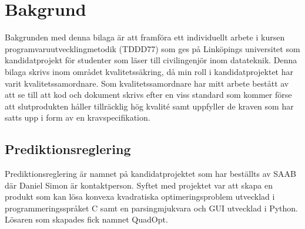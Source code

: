 \section{Bakgrund}
Bakgrunden med denna bilaga är att framföra ett individuellt arbete i kursen programvaruutvecklingmetodik (TDDD77) som ges på Linköpings universitet som kandidatprojekt för studenter som läser till civilingenjör inom datateknik. 
\newline
\newline
Denna bilaga skrivs inom området kvalitetssäkring, då min roll i kandidatprojektet har varit kvalitetssamordnare. Som kvalitetssamordnare har mitt arbete bestått av att se till att kod och dokument skrivs efter en viss standard som kommer förse att slutprodukten håller tillräcklig hög kvalité samt uppfyller de kraven som har satts upp i form av en kravspecifikation.

\subsection{Prediktionsreglering}
Prediktionsreglering är namnet på kandidatprojektet som har beställts av SAAB där Daniel Simon är kontaktperson. Syftet med projektet var att skapa en produkt som kan lösa konvexa kvadratiska optimeringsproblem utvecklad i programmeringsspråket C samt en parsingmjukvara och GUI utvecklad i Python. Lösaren som skapades fick namnet QuadOpt.
